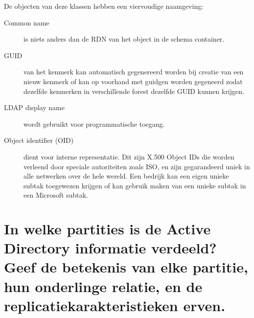De objecten van deze klassen hebben een viervoudige naamgeving:
\begin{description}
	\item[Common name] is niets anders dan de RDN van het object in de
		schema container.
	\item[GUID] van het kenmerk kan automatisch gegenereerd worden bij
		creatie van een nieuw kenmerk of kan op voorhand met guidgen
		worden gegeneerd zodat dezelfde kenmerken in verschillende
		forest dezelfde GUID kunnen krijgen.
	\item[LDAP display name] wordt gebruikt voor programmatische toegang.
	\item[Object identifier (OID)] dient voor interne representatie. Dit
		zijn X.500 Object IDs die worden verleend door speciale
		autoriteiten zoals ISO, en zijn gegarandeerd uniek in alle
		netwerken over de hele wereld. Een bedrijk kan een eigen unieke
		subtak toegewezen krijgen of kan gebruik maken van een unieke
		subtak in een Microsoft subtak.
\end{description}

\section{In welke partities is de Active Directory informatie verdeeld? Geef de
betekenis van elke partitie, hun onderlinge relatie, en de
replicatiekarakteristieken erven.}

